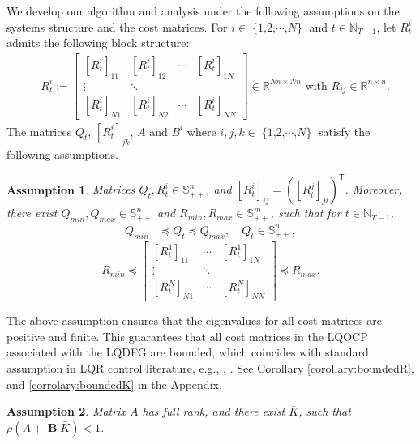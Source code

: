 \documentclass[letterpaper, 10 pt, conference]{ieeeconf}  %
\newcommand{\transpose}{\mathsf{T}}
\DeclareMathOperator{\contB}{\mathbf{B}}
\DeclareMathOperator{\Nplayers}{\{1,2,\cdots,\textit{N}\}}
\newtheorem{assumption}{Assumption}
\begin{document}
We develop our algorithm and analysis under the following assumptions on the systems structure and the cost matrices. For $i\in \Nplayers$ and $t \in \mathbb{N}_{T-1}$, let $R_{t}^{i}$ admits the following block structure:
    \begin{align}
   &R_{t}^{i} := 
   \begin{bmatrix}
       [R_{t}^{i}]_{11} & [R_{t}^{i}]_{12} & \cdots & [R_{t}^{i}]_{1N}\\
       \vdots & \ddots\\
       [R_{t}^{i}]_{N1} & [R_{t}^{i}]_{N2} & \cdots & [R_{t}^{i}]_{NN}
   \end{bmatrix}\in \mathbb{R}^{Nn\times Nn}\text{ with }R_{ij}\in \mathbb{R}^{n\times n}.
   \end{align}
The matrices $Q_{t}$, $[R_{t}^{i}]_{jk}$, $A$ and $B^{i}$ where $i,j,k \in \Nplayers$ satisfy the following assumptions.
\begin{assumption}\label{assumption:bounds}
    Matrices $Q_{t},R_{t}^{i} \in \mathbb{S}_{++}^{n}$, and $[R_{t}^{i}]_{ij} = ([R_{t}^{j}]_{ji})^{\transpose}$.
    Moreover, there exist $Q_{min}, Q_{max}\in \mathbb{S}_{++}^{n}$ and $R_{min}, R_{max}\in \mathbb{S}_{++}^{m}$, such that
    for $ t \in \mathbb{N}_{T-1}$,
    \begin{align*}
        Q_{min} &\preceq Q_{t} \preceq Q_{max}, \quad Q_{t} \in \mathbb{S}^{n}_{++},
    \end{align*}
    \begin{equation}\label{eq:positiveR}
        R_{min} \preceq 
        \begin{bmatrix}
            [R_{t}^{1}]_{11} & \cdots & [R_{t}^{1}]_{1N}\\
            \vdots & \ddots \\
            [R_{t}^{N}]_{N1} & \cdots & [R_{t}^{N}]_{NN}
        \end{bmatrix}
        \preceq R_{max}.
    \end{equation}
\end{assumption}
The above assumption ensures that the eigenvalues for all cost matrices are positive and finite. This guarantees that all cost matrices in the LQOCP associated with the LQDFG are bounded, which coincides with standard assumption in LQR control literature, e.g., \cite[Assumption 1]{chen_regret_2023}, \cite[Assumption 1]{sun_receding-horizon_2023}. See Corollary \ref{corollary:boundedR}, and \ref{corrolary:boundedK} in the Appendix. 
\begin{assumption}\label{assumption:controllable}
    Matrix $A$ has full rank, and there exist $\bar{K}$, such that $\rho(A + \contB \bar{K}) < 1$.
\end{assumption}
\end{document}
